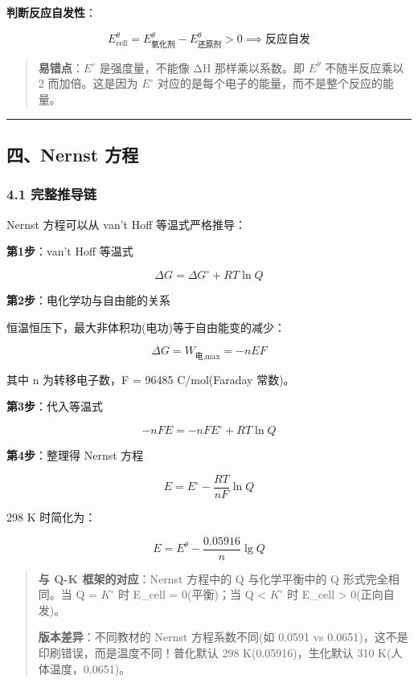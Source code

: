 \documentclass[a4paper,11pt]{ctexart}
\newcommand{\箭}{\ensuremath{\rightarrow}}
\newcommand{\左箭}{\ensuremath{\leftarrow}}
\newcommand{\上箭}{\ensuremath{\uparrow}}
\newcommand{\下箭}{\ensuremath{\downarrow}}
\newcommand{\衡}{\ensuremath{\rightleftharpoons}}
\newcommand{\双箭}{\ensuremath{\leftrightarrow}}
\newcommand{\约等于}{\ensuremath{\approx}}
\newcommand{\小于等于}{\ensuremath{\leq}}
\newcommand{\大于等于}{\ensuremath{\geq}}
\newcommand{\不等于}{\ensuremath{\neq}}
\newcommand{\西格马}{\ensuremath{\sigma}}
\newcommand{\派}{\ensuremath{\pi}}
\begin{document}
\textbf{判断反应自发性}：

\[
E_{\text{cell}}^\theta = E^\theta_{\text{氧化剂}} - E^\theta_{\text{还原剂}} > 0 \implies \text{反应自发}
\]

\begin{quote}
\textbf{易错点}：\(E^{\circ}\) 是强度量，不能像 ΔH 那样乘以系数。即 \(E^\theta\) 不随半反应乘以 2 而加倍。这是因为 \(E^{\circ}\) 对应的是每个电子的能量，而不是整个反应的能量。
\end{quote}

\begin{center}\rule{0.5\linewidth}{0.5pt}\end{center}

\subsection{四、Nernst 方程}\label{ux56dbnernst-ux65b9ux7a0b}

\subsubsection{4.1 完整推导链}\label{ux5b8cux6574ux63a8ux5bfcux94fe}

Nernst 方程可以从 van't Hoff 等温式严格推导：

\textbf{第1步}：van't Hoff 等温式

\[\Delta G = \Delta G^\circ + RT\ln Q\]

\textbf{第2步}：电化学功与自由能的关系

恒温恒压下，最大非体积功(电功)等于自由能变的减少：

\[\Delta G = W_{\text{电,max}} = -nEF\]

其中 n 为转移电子数，F = 96485 C/mol(Faraday 常数)。

\textbf{第3步}：代入等温式

\[-nFE = -nFE^\circ + RT\ln Q\]

\textbf{第4步}：整理得 Nernst 方程

\[\boxed{E = E^\circ - \frac{RT}{nF}\ln Q}\]

298 K 时简化为：

\[E = E^\theta - \frac{0.05916}{n}\lg Q\]

\begin{quote}
\textbf{与 Q-K 框架的对应}：Nernst 方程中的 Q 与化学平衡中的 Q 形式完全相同。当 Q = \(K^{\circ}\) 时 E\_cell = 0(平衡)；当 Q \textless{} \(K^{\circ}\) 时 E\_cell \textgreater{} 0(正向自发)。

\textbf{版本差异}：不同教材的 Nernst 方程系数不同(如 0.0591 vs 0.0651)，这不是印刷错误，而是温度不同！普化默认 298 K(0.05916)，生化默认 310 K(人体温度，0.0651)。
\end{quote}
\end{document}
